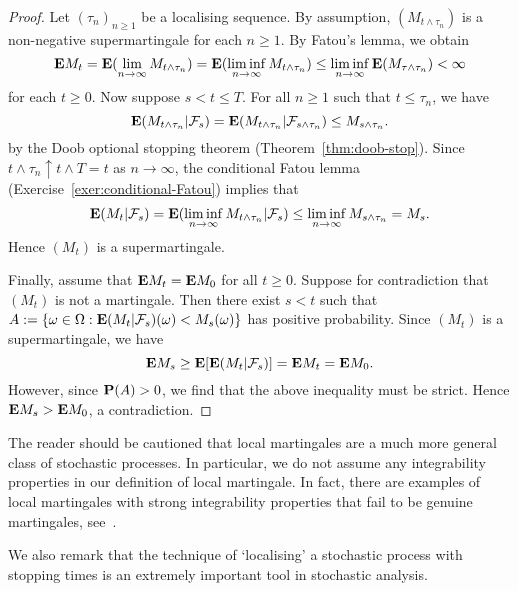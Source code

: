 \begin{proof}
	Let $(\tau_n)_{n\ge 1}$ be a localising sequence. By assumption, $(M_{t \wedge\tau_n})$ is a non-negative supermartingale for each $n\ge 1$. By Fatou's lemma, we obtain
	\begin{equation*}
		\mathbf{E} M_t = \mathbf{E}( \lim_{n\to\infty} M_{t\wedge\tau_n} ) = \mathbf{E}( \liminf_{n\to\infty} M_{t\wedge\tau_n}) \le \liminf_{n\to\infty} \mathbf{E}(M_{\tau\wedge\tau_n}) < \infty
	\end{equation*}
	for each $t\ge 0$. Now suppose $s<t\le T$. For all $n\ge 1$ such that $t\le \tau_n$, we have 
	\begin{equation*}
		\mathbf{E} (M_{t\wedge\tau_n} | \mathcal{F}_s) = \mathbf{E} (M_{t\wedge\tau_n} | \mathcal{F}_{s\wedge\tau_n}) \le M_{s\wedge\tau_n}.
	\end{equation*}
	by the Doob optional stopping theorem (Theorem~\ref{thm:doob-stop}). Since $t\wedge\tau_n \uparrow t\wedge T=t$ as $n\to\infty$, the conditional Fatou lemma (Exercise~\ref{exer:conditional-Fatou}) implies that
	\begin{equation*}
		\mathbf{E}(M_t | \mathcal{F}_s) = \mathbf{E}(\liminf_{n\to\infty} M_{t\wedge \tau_n} | \mathcal{F}_s) \le \liminf_{n\to\infty} M_{s\wedge \tau_n} = M_s.
	\end{equation*}
	Hence $(M_t)$ is a supermartingale. 
	
	Finally, assume that $\mathbf{E} M_t = \mathbf{E} M_0$ for all $t \ge 0$. Suppose for contradiction that $(M_t)$ is not a martingale. Then there exist $s<t$ such that $A := \{ \omega\in\Omega : \mathbf{E}(M_t | \mathcal{F}_s)(\omega) < M_s(\omega) \}$ has positive probability. Since $(M_t)$ is a supermartingale, we have
	\begin{equation*}
		\mathbf{E} M_s \ge \mathbf{E}[\mathbf{E}(M_t | \mathcal{F}_s)] = \mathbf{E} M_t = \mathbf{E} M_0.
	\end{equation*}
	However, since $\mathbf{P}(A)>0$, we find that the above inequality must be strict. Hence $\mathbf{E} M_s > \mathbf{E} M_0$, a contradiction.
\end{proof}

\begin{remark}
	The reader should be cautioned that local martingales are a much more general class of stochastic processes. In particular, we do not assume any integrability properties in our definition of local martingale. In fact, there are examples of local martingales with strong integrability properties that fail to be genuine martingales, see~\cite[Chapter V, Exercise 2.13]{RY}. 
	
	We also remark that the technique of `localising' a stochastic process with stopping times is an extremely important tool in stochastic analysis.
\end{remark}